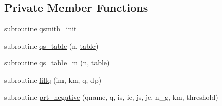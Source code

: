 \subsection*{Private Member Functions}
\begin{DoxyCompactItemize}
\item 
subroutine \hyperlink{classfv__sg__mod_aa63d7969bebc93461163d35d3f8c610c}{qsmith\-\_\-init}
\item 
subroutine \hyperlink{classfv__sg__mod_a4ba25958c1903ecd2f5f04bcf596a2aa}{qs\-\_\-table} (n, \hyperlink{classfv__sg__mod_a209ce37aa7b7e0fd8d042d2cd4cdacca}{table})
\item 
subroutine \hyperlink{classfv__sg__mod_a86dda2330b414a3e21cceed0e114f03f}{qs\-\_\-table\-\_\-m} (n, \hyperlink{classfv__sg__mod_a209ce37aa7b7e0fd8d042d2cd4cdacca}{table})
\item 
subroutine \hyperlink{classfv__sg__mod_a5308d44cc53f56bfd55451f11445eff0}{fillq} (im, km, q, dp)
\item 
subroutine \hyperlink{classfv__sg__mod_a14c9331c9654c3cfc6a7aca840bdbd30}{prt\-\_\-negative} (qname, q, is, ie, js, je, n\-\_\-g, km, threshold)
\end{DoxyCompactItemize}
